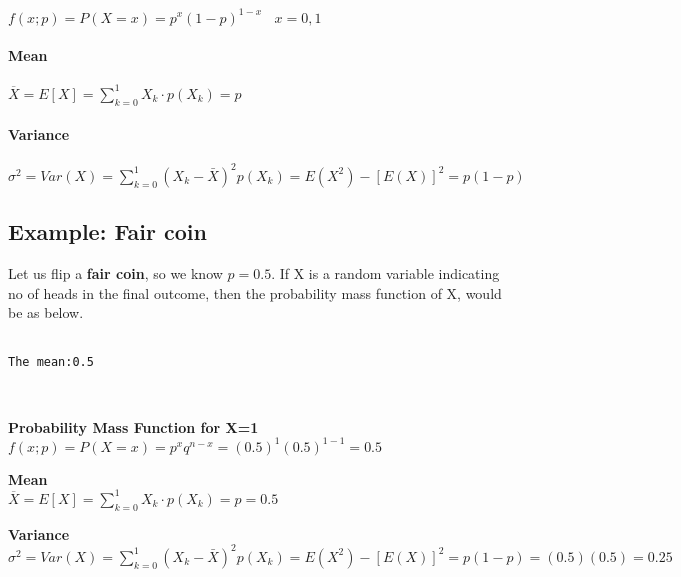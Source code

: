 \documentclass[float=false,crop=false]{standalone}
\begin{document}
\(f(x;p) = P(X = x) = p^{x}(1-p)^{1-x} \ \ \ \ x=0,1\)

\paragraph{Mean}\label{mean}

\(\overline{X } = E[X] = \sum\limits_{k=0}^1X_k \cdot p(X_k) = p\)

\paragraph{Variance}\label{variance}

\(\sigma^2 = Var(X) = \sum\limits_{k=0}^1 (X_{k}-\bar{X})^2p(X_k) = E(X^2) - [E(X)]^2 = p(1-p)\)

\subsection{Example: Fair coin}\label{example-fair-coin}

Let us flip a \textbf{fair coin}, so we know \(p = 0.5\). If X is a
random variable indicating no of heads in the final outcome, then the
probability mass function of X, would be as below.
    \begin{Verbatim}[commandchars=\\\{\},fontsize=\footnotesize]

The mean:0.5

    \end{Verbatim}

    \begin{center}
    \end{center}
    { \hspace*{\fill} \\}
    
    \textbf{Probability Mass Function for X=1}\\
\(f(x;p) = P(X = x) = p^{x}q^{n-x} = (0.5)^{1}(0.5)^{1-1} = 0.5\)

\textbf{Mean}\\
\(\overline{X} = E[X] = \sum\limits_{k=0}^1X_k \cdot p(X_k) = p = 0.5\)

\textbf{Variance}\\
\(\sigma^2 = Var(X) = \sum\limits_{k=0}^1 (X_{k}-\bar{X})^2p(X_k) = E(X^2) - [E(X)]^2 = p(1-p) = (0.5)(0.5) = 0.25\)
\end{document}
